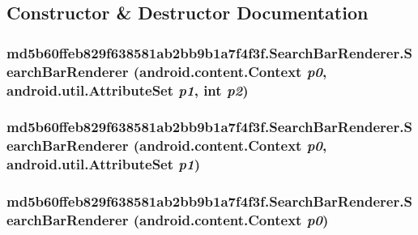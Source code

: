 \subsection{Constructor \& Destructor Documentation}
\hypertarget{classmd5b60ffeb829f638581ab2bb9b1a7f4f3f_1_1_search_bar_renderer_0c52f1938dc18326653f3a5413d92428}{
\subsubsection[{SearchBarRenderer}]{\setlength{\rightskip}{0pt plus 5cm}md5b60ffeb829f638581ab2bb9b1a7f4f3f.SearchBarRenderer.SearchBarRenderer (android.content.Context {\em p0}, \/  android.util.AttributeSet {\em p1}, \/  int {\em p2})}}
\label{classmd5b60ffeb829f638581ab2bb9b1a7f4f3f_1_1_search_bar_renderer_0c52f1938dc18326653f3a5413d92428}


\hypertarget{classmd5b60ffeb829f638581ab2bb9b1a7f4f3f_1_1_search_bar_renderer_878e0ca2cd8969a1c594bb1dae952c3a}{
\subsubsection[{SearchBarRenderer}]{\setlength{\rightskip}{0pt plus 5cm}md5b60ffeb829f638581ab2bb9b1a7f4f3f.SearchBarRenderer.SearchBarRenderer (android.content.Context {\em p0}, \/  android.util.AttributeSet {\em p1})}}
\label{classmd5b60ffeb829f638581ab2bb9b1a7f4f3f_1_1_search_bar_renderer_878e0ca2cd8969a1c594bb1dae952c3a}


\hypertarget{classmd5b60ffeb829f638581ab2bb9b1a7f4f3f_1_1_search_bar_renderer_7c99ebcffaa2c273a4adbc8e4fc8281a}{
\subsubsection[{SearchBarRenderer}]{\setlength{\rightskip}{0pt plus 5cm}md5b60ffeb829f638581ab2bb9b1a7f4f3f.SearchBarRenderer.SearchBarRenderer (android.content.Context {\em p0})}}
\label{classmd5b60ffeb829f638581ab2bb9b1a7f4f3f_1_1_search_bar_renderer_7c99ebcffaa2c273a4adbc8e4fc8281a}




